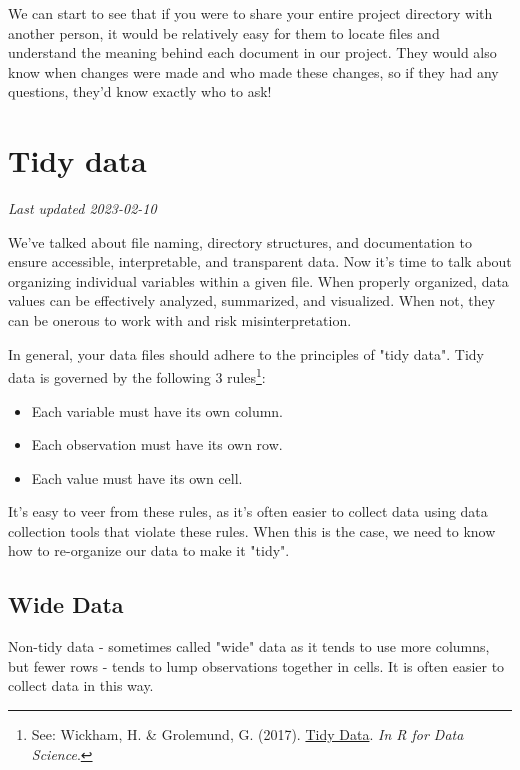 \documentclass[
]{book}
\providecommand{\tightlist}{%
  \setlength{\itemsep}{0pt}\setlength{\parskip}{0pt}}
\begin{document}
We can start to see that if you were to share your entire project directory with another person, it would be relatively easy for them to locate files and understand the meaning behind each document in our project. They would also know when changes were made and who made these changes, so if they had any questions, they'd know exactly who to ask!

\hypertarget{tidy-data}{%
\chapter{Tidy data}\label{tidy-data}}

\emph{Last updated 2023-02-10}

We've talked about file naming, directory structures, and documentation to ensure accessible, interpretable, and transparent data. Now it's time to talk about organizing individual variables within a given file. When properly organized, data values can be effectively analyzed, summarized, and visualized. When not, they can be onerous to work with and risk misinterpretation.

In general, your data files should adhere to the principles of "tidy data". Tidy data is governed by the following 3 rules\footnote{See: Wickham, H. \& Grolemund, G. (2017). \href{https://r4ds.had.co.nz/tidy-data.html}{Tidy Data}. \emph{In R for Data Science}.}:

\begin{itemize}
\tightlist
\item
  Each variable must have its own column.
\item
  Each observation must have its own row.
\item
  Each value must have its own cell.
\end{itemize}

It's easy to veer from these rules, as it's often easier to collect data using data collection tools that violate these rules. When this is the case, we need to know how to re-organize our data to make it "tidy".

\hypertarget{wide-data}{%
\section{Wide Data}\label{wide-data}}

Non-tidy data - sometimes called "wide" data as it tends to use more columns, but fewer rows - tends to lump observations together in cells. It is often easier to collect data in this way.
\end{document}
